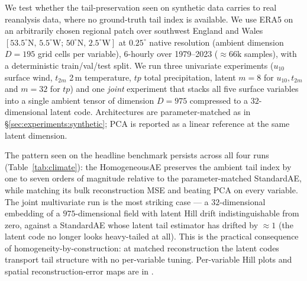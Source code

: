 \documentclass{article}
\theoremstyle{definition}
\begin{document}
We test whether the tail-preservation seen on synthetic data
carries to real reanalysis data, where no ground-truth tail index
is available. We use ERA5 \citep{Hersbach_2020} on an arbitrarily
chosen regional patch over southwest England and Wales
$[53.5^\circ\mathrm{N},\,5.5^\circ\mathrm{W};\,50^\circ\mathrm{N},\,2.5^\circ\mathrm{W}]$
at $0.25^\circ$ native resolution (ambient dimension $D{=}195$ grid
cells per variable), 6-hourly over 1979--2023 ($\approx 66\mathrm{k}$
samples), with a deterministic train/val/test split. We run three univariate
experiments ($u_{10}$ surface wind, $t_{2m}$ 2\,m temperature, $tp$
total precipitation, latent $m{=}8$ for $u_{10},t_{2m}$ and $m{=}32$
for $tp$) and one \emph{joint} experiment that stacks all five
surface variables into a single ambient tensor of dimension $D{=}975$
compressed to a $32$-dimensional latent code. Architectures are
parameter-matched as in \S\ref{sec:experiments:synthetic}; PCA is
reported as a linear reference at the same latent dimension.

The pattern seen on the headline benchmark persists across all four
runs (Table~\ref{tab:climate}): the HomogeneousAE preserves the
ambient tail index by one to seven orders of magnitude relative to
the parameter-matched StandardAE, while matching its bulk
reconstruction MSE and beating PCA on every variable. The joint
multivariate run is the most striking case --- a $32$-dimensional
embedding of a $975$-dimensional field with latent Hill drift
indistinguishable from zero, against a StandardAE whose latent tail
estimator has drifted by $\approx 1$ (the latent code no longer
looks heavy-tailed at all). This is the practical consequence of
homogeneity-by-construction: at matched reconstruction the latent
codes transport tail structure with no per-variable tuning.
Per-variable Hill plots and spatial reconstruction-error maps are
in .
\end{document}
